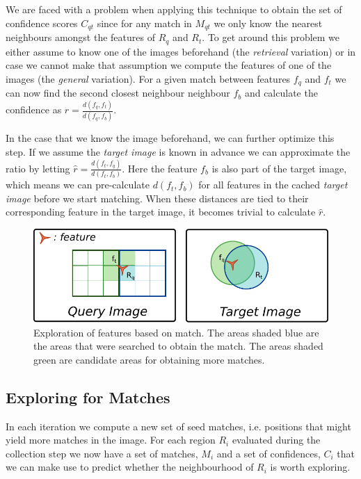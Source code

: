 \documentclass[runningheads]{llncs}
\begin{document}
We are faced with a problem when applying this technique to obtain the set of confidence scores $C_{qt}$ since for any match in $M_{qt}$ we only know the nearest neighbours amongst the features of $R_q$ and $R_t$. To get around this problem we either assume to know one of the images beforehand (the \emph{retrieval} variation) or in case we cannot make that assumption we compute the features of one of the images (the \emph{general} variation). For a given match between features $f_q$ and $f_t$ we can now find the second closest neighbour neighbour $f_b$ and calculate the confidence as $r = \frac{d(f_q, f_t)}{d(f_q,f_b)}$.

In the case that we know the image beforehand, we can further optimize this step. If we assume the \emph{target image} is known in advance we can approximate the ratio by letting $\hat r = \frac{d(f_t, f_q)}{d(f_t,f_b)}$. Here the feature $f_b$ is also part of the target image, which means we can pre-calculate $d(f_t, f_b)$ for all features in the cached \emph{target image} before we start matching. When these distances are tied to their corresponding feature in the target image, it becomes trivial to calculate $\hat r$.

\begin{figure}[t]
\centering
\includegraphics[width=0.75\columnwidth]{images/exploration}
\caption{Exploration of features based on match. The areas shaded blue are the areas that were searched to obtain the match. The areas shaded green are candidate areas for obtaining more matches.}
\label{fig:exploration}
\end{figure}

\subsection{Exploring for Matches}
\label{exploring}
In each iteration we compute a new set of seed matches, i.e. positions that might yield more matches in the image. For each region $R_i$ evaluated during the collection step we now have a set of matches, $M_i$ and a set of confidences, $C_i$ that we can make use to predict whether the neighbourhood of $R_i$ is worth exploring.
\end{document}
